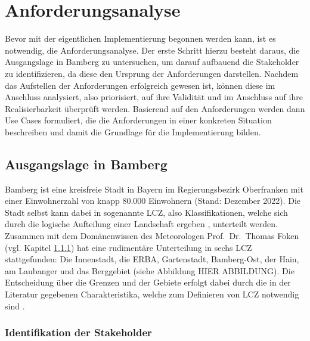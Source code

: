 \chapter{Anforderungsanalyse}
\label{sec:requirements}
Bevor mit der eigentlichen Implementierung begonnen werden kann, ist es notwendig, die Anforderungsanalyse. Der erste Schritt hierzu besteht daraus, die Ausgangslage in Bamberg zu untersuchen, um darauf aufbauend die Stakeholder zu identifizieren, da diese den Ursprung der Anforderungen darstellen. Nachdem das Aufstellen der Anforderungen erfolgreich gewesen ist, können diese im Anschluss analysiert, also priorisiert, auf ihre Validität und im Anschluss auf ihre Realisierbarkeit überprüft werden. Basierend auf den Anforderungen werden dann Use Cases formuliert, die die Anforderungen in einer konkreten Situation beschreiben und damit die Grundlage für die Implementierung bilden.

\section{Ausgangslage in Bamberg}
\label{sec:ausgangslage}
Bamberg ist eine kreisfreie Stadt in Bayern im Regierungsbezirk Oberfranken mit einer Einwohnerzahl von knapp 80.000 Einwohnern (Stand: Dezember 2022). Die Stadt selbst kann dabei in sogenannte \ac{LCZ}, also Klassifikationen, welche sich durch die logische Aufteilung einer Landschaft ergeben \cite{stewart2011local}, unterteilt werden. Zusammen mit dem Domänenwissen des Meteorologen Prof.\ Dr.\ Thomas Foken (vgl. Kapitel \ref{sec:stakeholder}) hat eine rudimentäre Unterteilung in sechs LCZ stattgefunden: Die Innenstadt, die ERBA, Gartenstadt, Bamberg-Ost, der Hain, am Laubanger und das Berggebiet (siehe Abbildung HIER ABBILDUNG). Die Entscheidung über die Grenzen und der Gebiete erfolgt dabei durch die in der Literatur gegebenen Charakteristika, welche zum Definieren von LCZ notwendig sind \cite{oke2004initial, stewart2012local}. %

\subsection{Identifikation der Stakeholder}
\label{sec:stakeholder}

